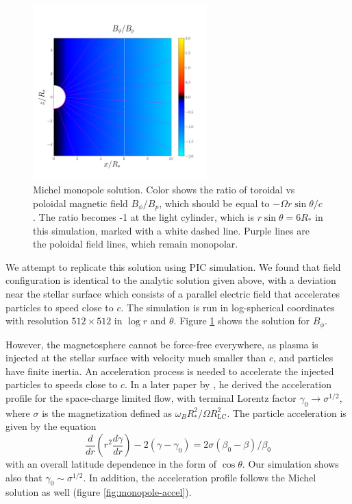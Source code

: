 \begin{figure}[h]
  \centering
  \includegraphics[width=0.6\textwidth]{pics/chap1/monopole-Bphi.png}
  \caption[Michel monopole solution.]{Michel monopole solution. Color shows the
    ratio of toroidal vs poloidal magnetic field $B_{\phi}/B_{p}$, which should
    be equal to $-\Omega r\sin\theta /c$. The ratio becomes -1 at the light
    cylinder, which is $r\sin\theta = 6R_{*}$ in this simulation, marked with
    a white dashed line. Purple lines are the poloidal field lines, which remain
    monopolar.}
  \label{fig:monopole-Bphi}
\end{figure}

We attempt to replicate this solution using PIC simulation. We found that field
configuration is identical to the analytic solution given above, with a
deviation near the stellar surface which consists of a parallel electric field
that accelerates particles to speed close to $c$. The simulation is run in
log-spherical coordinates with resolution $512\times 512$ in $\log r$ and
$\theta$. Figure \ref{fig:monopole-Bphi} shows the solution for $B_{\phi}$.

However, the magnetosphere cannot be force-free everywhere, as plasma is
injected at the stellar surface with velocity much smaller than $c$, and
particles have finite inertia. An acceleration process is needed to accelerate
the injected particles to speeds close to $c$. In a later paper by
\citet{michel_rotating_1974}, he derived the acceleration profile for the
space-charge limited flow, with terminal Lorentz factor $\gamma_{0}\to
\sigma^{1/2}$, where $\sigma$ is the magnetization defined as
$\omega_{B}R_{*}^2/\Omega R_\mathrm{LC}^2$. The particle acceleration is given
by the equation
\begin{equation}
  \label{eq:michel-accel}
  \frac{d}{dr}\left( r^2\frac{d\gamma}{dr} \right) - 2(\gamma - \gamma_0) = 2\sigma(\beta_0 - \beta)/\beta_0
\end{equation}
with an overall latitude dependence in the form of $\cos\theta$. Our simulation
shows also that $\gamma_0\sim \sigma^{1/2}$. In addition, the acceleration
profile follows the Michel solution as well (figure
\ref{fig:monopole-accel}). %

